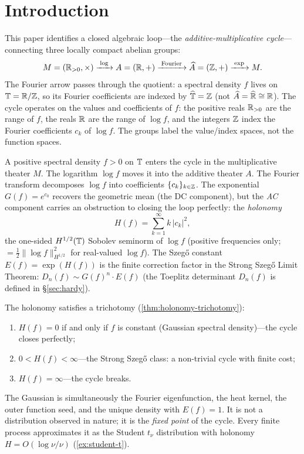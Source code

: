 \section*{Introduction}

This paper identifies a closed algebraic loop---the
\emph{additive-multiplicative cycle}---connecting three locally compact
abelian groups:
\[
M = (\mathbb{R}_{>0}, \times)
\xrightarrow{\;\log\;}
A = (\mathbb{R}, +)
\xrightarrow{\;\text{Fourier}\;}
\widehat{A} = (\mathbb{Z}, +)
\xrightarrow{\;\exp\;}
M.
\]
The Fourier arrow passes through the quotient: a spectral density $f$ lives on $\mathbb{T} = \mathbb{R}/\mathbb{Z}$, so its Fourier coefficients are indexed by $\widehat{\mathbb{T}} = \mathbb{Z}$ (not $\widehat{A} = \widehat{\mathbb{R}} \cong \mathbb{R}$). The cycle operates on the values and coefficients of $f$: the positive reals $\mathbb{R}_{>0}$ are the range of $f$, the reals $\mathbb{R}$ are the range of $\log f$, and the integers $\mathbb{Z}$ index the Fourier coefficients $c_k$ of $\log f$. The groups label the value/index spaces, not the function spaces.

A positive spectral density $f > 0$ on $\mathbb{T}$ enters the cycle in the multiplicative theater $M$. The logarithm $\log f$ moves it into the additive theater $A$. The Fourier transform decomposes $\log f$ into coefficients $\{c_k\}_{k \in \mathbb{Z}}$. The exponential $G(f) = e^{c_0}$ recovers the geometric mean (the DC component), but the \emph{AC} component carries an obstruction to closing the loop perfectly: the \emph{holonomy}
\[
H(f) = \sum_{k=1}^{\infty} k\,|c_k|^2,
\]
the one-sided $H^{1/2}(\mathbb{T})$ Sobolev seminorm of $\log f$ (positive frequencies only; $= \tfrac{1}{2}\|\log f\|_{H^{1/2}}^2$ for real-valued $\log f$). The Szeg\H{o} constant $E(f) = \exp(H(f))$ is the finite correction factor in the Strong Szeg\H{o} Limit Theorem: $D_n(f) \sim G(f)^n \cdot E(f)$ (the Toeplitz determinant $D_n(f)$ is defined in \S\ref{sec:hardy}).

The holonomy satisfies a trichotomy (\cref{thm:holonomy-trichotomy}):
\begin{enumerate}[label=(\roman*)]
\item $H(f) = 0$ if and only if $f$ is constant (Gaussian spectral density)---the cycle closes perfectly;
\item $0 < H(f) < \infty$---the Strong Szeg\H{o} class: a non-trivial cycle with finite cost;
\item $H(f) = \infty$---the cycle breaks.
\end{enumerate}
The Gaussian is simultaneously the Fourier eigenfunction, the heat kernel, the outer function seed, and the unique density with $E(f) = 1$. It is not a distribution observed in nature; it is the \emph{fixed point} of the cycle. Every finite process approximates it as the Student $t_\nu$ distribution with holonomy $H = O(\log\nu/\nu)$ (\cref{ex:student-t}).

